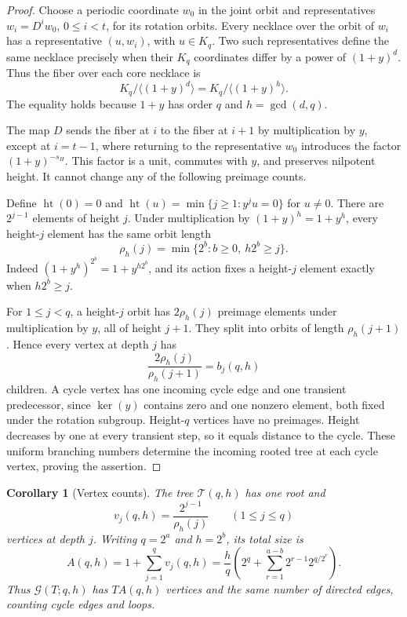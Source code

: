\documentclass[11pt]{article}
\newtheorem{corollary}[theorem]{Corollary}
\theoremstyle{definition}
\theoremstyle{remark}
\numberwithin{equation}{section}
\newcommand{\G}{\mathcal G}
\DeclareMathOperator{\height}{ht}
\begin{document}
\begin{proof}
Choose a periodic coordinate $w_0$ in the joint orbit and representatives
$w_i=D^i w_0$, $0\le i<t$, for its rotation orbits. Every necklace over
the orbit of $w_i$ has a representative $(u,w_i)$, with $u\in K_q$.
Two such representatives define the same necklace precisely when their
$K_q$ coordinates differ by a power of $(1+y)^d$. Thus the fiber over
each core necklace is
\begin{equation}\label{eq:fiber}
 K_q/\langle(1+y)^d\rangle
 =K_q/\langle(1+y)^h\rangle.
\end{equation}
The equality holds because $1+y$ has order $q$ and $h=\gcd(d,q)$.

The map $D$ sends the fiber at $i$ to the fiber at $i+1$ by multiplication
by $y$, except at $i=t-1$, where returning to the representative $w_0$
introduces the factor $(1+y)^{-s_H}$. This factor is a unit, commutes with
$y$, and preserves nilpotent height. It cannot change any of the following
preimage counts.

Define $\height(0)=0$ and
$\height(u)=\min\{j\ge1:y^ju=0\}$ for $u\ne0$. There are $2^{j-1}$
elements of height $j$. Under multiplication by $(1+y)^h=1+y^h$, every
height-$j$ element has the same orbit length
\begin{equation}\label{eq:rho}
 \rho_h(j)=\min\{2^b:b\ge0,\ h2^b\ge j\}.
\end{equation}
Indeed $(1+y^h)^{2^b}=1+y^{h2^b}$, and its action fixes a height-$j$
element exactly when $h2^b\ge j$.

For $1\le j<q$, a height-$j$ orbit has $2\rho_h(j)$ preimage elements
under multiplication by $y$, all of height $j+1$. They split into orbits
of length $\rho_h(j+1)$. Hence every vertex at depth $j$ has
\[
 \frac{2\rho_h(j)}{\rho_h(j+1)}=b_j(q,h)
\]
children. A cycle vertex has one incoming cycle edge and one transient
predecessor, since $\ker(y)$ contains zero and one nonzero element, both
fixed under the rotation subgroup. Height-$q$ vertices have no preimages.
Height decreases by one at every transient step, so it equals distance to
the cycle. These uniform branching numbers determine the incoming rooted
tree at each cycle vertex, proving the assertion.
\end{proof}

\begin{corollary}[Vertex counts]\label{cor:vertices}
The tree $\mathcal T(q,h)$ has one root and
\begin{equation}\label{eq:level-count}
 v_j(q,h)=\frac{2^{j-1}}{\rho_h(j)}\qquad(1\le j\le q)
\end{equation}
vertices at depth $j$. Writing $q=2^a$ and $h=2^b$, its total size is
\begin{equation}\label{eq:tree-size}
 A(q,h)=1+\sum_{j=1}^q v_j(q,h)
 =\frac hq\left(2^q+\sum_{r=1}^{a-b}2^{r-1}2^{q/2^r}\right).
\end{equation}
Thus $\G(T;q,h)$ has $TA(q,h)$ vertices and the same number of directed
edges, counting cycle edges and loops.
\end{corollary}
\end{document}
